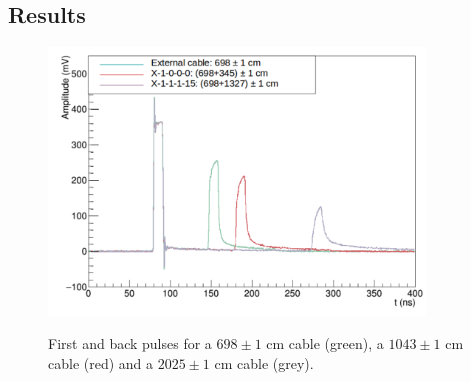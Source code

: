 \subsection{Results}


\begin{figure}
  \centering
  \includegraphics[width=10cm]{commissioning/fig_commissioning/length_tests.pdf}
  \label{fig:cable_lengths}
  \caption{First and back pulses for a $698 \pm 1$ cm cable (green), a $1043 \pm 1$ cm cable (red) and a $2025 \pm 1$ cm cable (grey).}
\end{figure}
